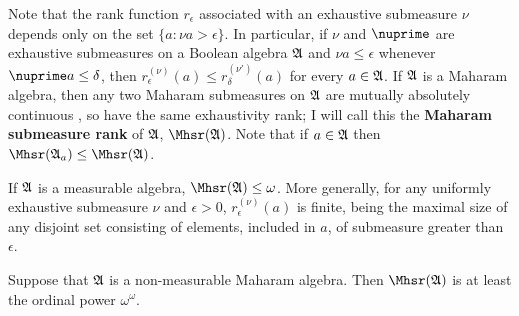 
 Note that the rank
function $r_{\epsilon}$ associated with an exhaustive submeasure
$\nu$ depends only on the set $\{a:\nu a>\epsilon\}$.   In
particular, if $\nu$ and $\nuprime$ are exhaustive submeasures on a
Boolean algebra $\frak A$ and
$\nu a\le\epsilon$ whenever $\nuprime a\le\delta$, then
$r^{(\nu)}_{\epsilon}(a)\le r^{(\nu')}_{\delta}(a)$ for every
$a\in\frak A$.   If $\frak A$ is a Maharam algebra, then any two
Maharam submeasures on $\frak A$ are mutually absolutely continuous
, so have the same exhaustivity rank;
I will call this the
{\bf Maharam submeasure rank} of $\frak A$, $\Mhsr(\frak A)$.
Note that if $a\in\frak A$ then $\Mhsr(\frak A_a)\le\Mhsr(\frak A)$.

If $\frak A$ is a measurable algebra, $\Mhsr(\frak A)\le\omega$.
More generally,
for any uniformly exhaustive submeasure $\nu$ and $\epsilon>0$,
$r^{(\nu)}_{\epsilon}(a)$ is finite, being
the maximal size of any disjoint set
consisting of elements, included in $a$,
of submeasure greater than $\epsilon$.

 Suppose that $\frak A$ is a non-measurable
Maharam algebra.   Then
$\Mhsr(\frak A)$ is at least the ordinal power $\omega^{\omega}$.

